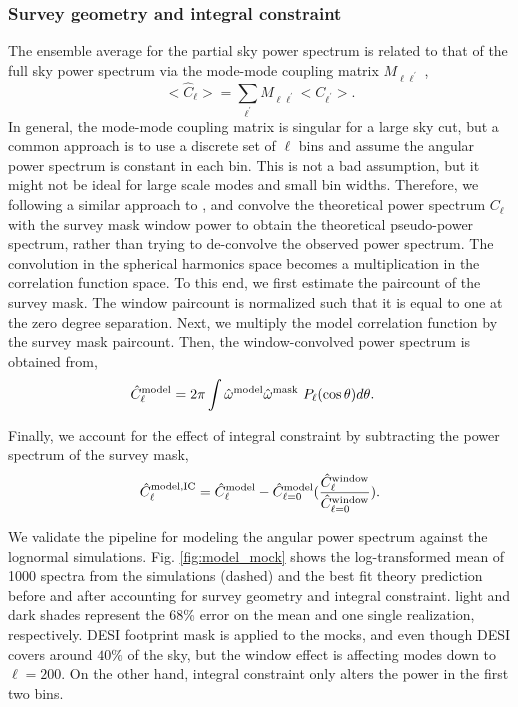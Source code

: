 \subsubsection{Survey geometry and integral constraint}
The ensemble average for the partial sky power spectrum is related to that of the full sky power spectrum via the mode-mode coupling matrix $M_{\ell \ell^{\prime}}$ ,
\begin{equation}
    <\hat{C}_{\ell}> = \sum_{\ell^{\prime}} M_{\ell \ell^{\prime}}<C_{\ell^{\prime}}>.
\end{equation}
In general, the mode-mode coupling matrix is singular for a large sky cut, but a common approach is to use a discrete set of $\ell$ bins and assume the angular power spectrum is constant in each bin. This is not a bad assumption, but it might not be ideal for large scale modes and small bin widths. Therefore, we following a similar approach to \cite{chon2004fast}, and convolve the theoretical power spectrum $C_{\ell}$ with the survey mask window power to obtain the theoretical pseudo-power spectrum, rather than trying to de-convolve the observed power spectrum. The convolution in the spherical harmonics space becomes a multiplication in the correlation function space. To this end, we first estimate the paircount of the survey mask. The window paircount is normalized such that it is equal to one at the zero degree separation. Next, we multiply the model correlation function by the survey mask paircount. Then, the window-convolved power spectrum is obtained from,
\begin{align}
    \hat{C}^{\rm model}_{\ell} &= 2\pi \int \hat{\omega}^{\rm model}\hat{\omega}^{\rm mask}~P_{\ell}(\cos \theta) d\theta.
\end{align}

Finally, we account for the effect of integral constraint by subtracting the power spectrum of the survey mask,
\begin{equation}
     \hat{C}^{\rm model, IC}_{\ell} = \hat{C}^{\rm model}_{\ell} - \hat{C}^{\rm model}_{\ell=0} (\frac{\hat{C}^{\rm window}_{\ell}}{\hat{C}^{\rm window}_{\ell=0}}).
\end{equation}

We validate the pipeline for modeling the angular power spectrum against the lognormal simulations. Fig. \ref{fig:model_mock} shows the log-transformed mean of 1000 spectra from the simulations (dashed) and the best fit theory prediction before and after accounting for survey geometry and integral constraint. light and dark shades represent the 68\% error on the mean and one single realization, respectively. DESI footprint mask is applied to the mocks, and even though DESI covers around $40\%$ of the sky, but the window effect is affecting modes down to $\ell=200$. On the other hand, integral constraint only alters the power in the first two bins.

